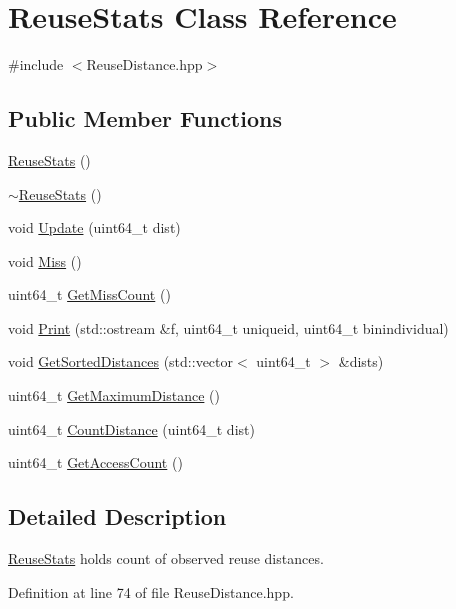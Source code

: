 \hypertarget{class_reuse_stats}{
\section{ReuseStats Class Reference}
\label{class_reuse_stats}
}


{\ttfamily \#include $<$ReuseDistance.hpp$>$}\subsection*{Public Member Functions}
\begin{DoxyCompactItemize}
\item 
\hyperlink{class_reuse_stats_a0106660db234ec0ea484c61cb18702e8}{ReuseStats} ()
\item 
\hyperlink{class_reuse_stats_a21f8a5cab3976edba08c2562c3ed8d45}{$\sim$ReuseStats} ()
\item 
void \hyperlink{class_reuse_stats_a5383136c63ed260d9aad44a8d048a2ed}{Update} (uint64\_\-t dist)
\item 
void \hyperlink{class_reuse_stats_a3d963a3b6c2c0b37b23d4e0723a70831}{Miss} ()
\item 
uint64\_\-t \hyperlink{class_reuse_stats_aeff4f3fe0f2253e1aed432b18ec85d85}{GetMissCount} ()
\item 
void \hyperlink{class_reuse_stats_a950e46c58818c5afda7038f7345421d6}{Print} (std::ostream \&f, uint64\_\-t uniqueid, uint64\_\-t binindividual)
\item 
void \hyperlink{class_reuse_stats_adcb657e303c090ac5ef210f6c4506986}{GetSortedDistances} (std::vector$<$ uint64\_\-t $>$ \&dists)
\item 
uint64\_\-t \hyperlink{class_reuse_stats_ac70175a532ea2dc608e0fd2f04e4fcbb}{GetMaximumDistance} ()
\item 
uint64\_\-t \hyperlink{class_reuse_stats_abdb92b77ec7191be80e77a34f894e11b}{CountDistance} (uint64\_\-t dist)
\item 
uint64\_\-t \hyperlink{class_reuse_stats_a48935d131ce635b1b37b2a43f0c52217}{GetAccessCount} ()
\end{DoxyCompactItemize}


\subsection{Detailed Description}
\hyperlink{class_reuse_stats}{ReuseStats} holds count of observed reuse distances. 

Definition at line 74 of file ReuseDistance.hpp.

